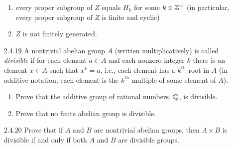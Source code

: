 \begin{enumerate}
\begin{enumerate}
                     \item every proper subgroup of $Z$ equals $H_k$ for some
                           $k \in \mathbb{Z}^+$ (in particular, every proper subgroup of
                           $Z$ is finite and cyclic)
                     \item $Z$ is not finitely generated.
                  \end{enumerate}
   \item[2.4.19]  A nontrivial abelian group $A$ (written multiplicatively) is
                  called \textit{divisible} if for each element $a \in A$ and
                  each nonzero integer $k$ there is an element $x \in A$ such
                  that $x^k = a$, i.e., each element has a $k^{\text{th}}$ root
                  in $A$ (in additive notation, each element is the
                  $k^{\text{th}}$ multiple of some element of $A$).
                  \begin{enumerate}
                     \item Prove that the additive group of rational numbers,
                           $\mathbb{Q}$, is divisible.
                     \item Prove that no finite abelian group is divisible.
                  \end{enumerate}
   \item[2.4.20]  Prove that if $A$ and $B$ are nontrivial abelian groups, then
                  $A \times B$ is divisible if and only if both $A$ and $B$ are
                  divisible groups.
\end{enumerate}

































